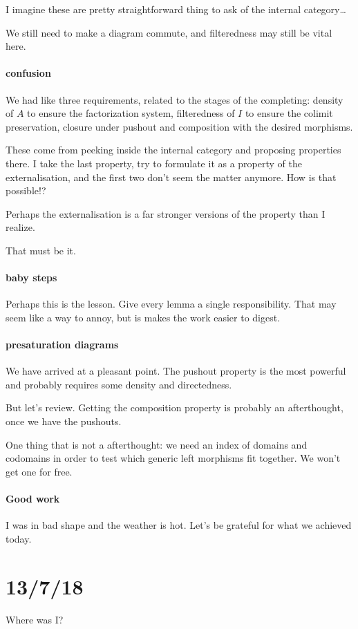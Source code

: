 \documentclass[csh.tex]{subfiles}
\begin{document}
I imagine these are pretty straightforward thing to ask of the internal category\dots

We still need to make a diagram commute, and filteredness may still be vital here.

\paragraph{confusion}
We had like three requirements, related to the stages of the completing:
density of $A$ to ensure the factorization system, 
filteredness of $I$ to ensure the colimit preservation,
closure under pushout and composition with the desired morphisms.

These come from peeking inside the internal category and proposing properties there.
I take the last property, try to formulate it as a property of the externalisation, and the first two don't seem the matter anymore.
How is that possible!?


Perhaps the externalisation is a far stronger versions of the property than I realize.

That must be it.

\paragraph{baby steps}
Perhaps this is the lesson. Give every lemma a single responsibility. That may seem like a way to annoy, but is makes the work easier to digest.

\paragraph{presaturation diagrams}
We have arrived at a pleasant point.
The pushout property is the most powerful and probably requires some density and directedness.

But let's review.
Getting the composition property is probably an afterthought, once we have the pushouts. 

One thing that is not a afterthought: we need an index of domains and codomains in order to test which generic left morphisms fit together. We won't get one for free.

\paragraph{Good work}
I was in bad shape and the weather is hot. Let's be grateful for what we achieved today.

\section{13/7/18}
Where was I?
\end{document}
